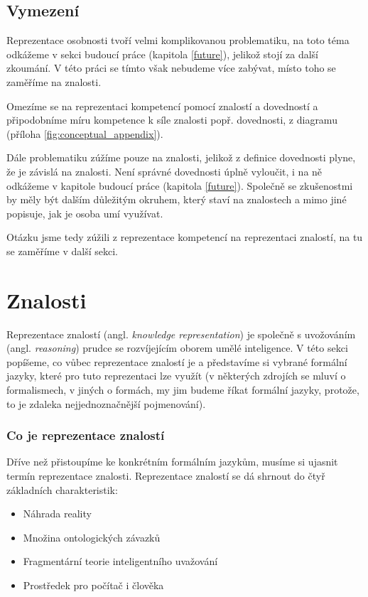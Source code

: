 \subsection{Vymezení}
Reprezentace osobnosti tvoří velmi komplikovanou problematiku, na toto téma odkážeme v sekci budoucí práce (kapitola \ref{future}), jelikož stojí za další zkoumání. V této práci se tímto však nebudeme více zabývat, místo toho se zaměříme na znalosti.\par
Omezíme se na reprezentaci kompetencí pomocí znalostí a dovedností a připodobníme míru kompetence k síle znalosti popř. dovednosti, z diagramu (příloha \ref{fig:conceptual_appendix}). 
\par
Dále problematiku zúžíme pouze na znalosti, jelikož z definice dovednosti plyne, že je závislá na znalosti. Není správné dovednosti úplně vyloučit, i na ně odkážeme v kapitole budoucí práce (kapitola \ref{future}). Společně se zkušenostmi by měly být dalším důležitým okruhem, který staví na znalostech a mimo jiné popisuje, jak je osoba umí využívat.\par
Otázku jsme tedy zúžili z reprezentace kompetencí na reprezentaci znalostí, na tu se zaměříme v další sekci.
\section{Znalosti} \label{sec:knowledge_representation}
Reprezentace znalostí (angl. \textit{knowledge representation}) je společně s uvožováním (angl. \textit{reasoning}) prudce se rozvíjejícím oborem umělé inteligence. V této sekci popíšeme, co vůbec reprezentace znalostí je a představíme si vybrané formální jazyky, které pro tuto reprezentaci lze využít (v některých zdrojích se mluví o formalismech, v jiných o formách, my jim budeme říkat formální jazyky, protože, to je zdaleka nejjednoznačnější pojmenování).
\subsubsection{Co je reprezentace znalostí}
Dříve než přistoupíme ke konkrétním formálním jazykům, musíme si ujasnit termín reprezentace znalosti. Reprezentace znalostí se dá shrnout do čtyř základních charakteristik:
\begin{itemize}
\item Náhrada reality
\item Množina ontologických závazků
\item Fragmentární teorie inteligentního uvažování
\item Prostředek pro počítač i člověka \cite{cite:09}
\end{itemize}

